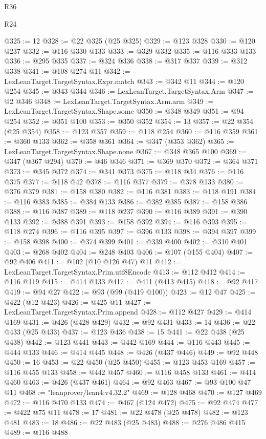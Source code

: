 \begin{lexlean}{R36}
\begin{lexlean}{R24}
\begin{coremodule}
{{{{{{{{{{{{{{{{{{{{{{{{{{{{{{{{{{{{{{{{{{{{{{{{{{{{{{{{{{{{{{{{{{{{{{{{{{{{{{{{{{{{{{{{{{{{{{{{{{{{{{{{{{{{{{{{{{{{{{{{{{{{{{{{{{{{{{{{{{{{{{{{{{{{{{{{{{{{{{{{{{{{{{{{{{{{{{{{{{{{{{{{{{{{{{{{{{{@325 := 12
@328 := @22 @325 (@25 @325)
@329 := @123 @328
@330 := @120 @237
@332 := @116 @330 @133
@333 := @329 @332
@335 := @116 @333 @133
@336 := @295 @335
@337 := @324 @336
@338 := @317 @337
@339 := @312 @338
@341 := @108 @274 @11
@342 := LexLeanTarget.TargetSyntax.Expr.match
@343 := @342 @11
@344 := @120 @254
@345 := @343 @344
@346 := LexLeanTarget.TargetSyntax.Arm
@347 := @2 @346
@348 := LexLeanTarget.TargetSyntax.Arm.arm
@349 := LexLeanTarget.TargetSyntax.Shape.some
@350 := @348 @349
@351 := @94 @254
@352 := @351 @100
@353 := @350 @352
@354 := 13
@357 := @22 @354 (@25 @354)
@358 := @123 @357
@359 := @118 @254
@360 := @116 @359
@361 := @360 @133
@362 := @358 @361
@364 := @347 (@353 @362)
@365 := LexLeanTarget.TargetSyntax.Shape.none
@367 := @348 @365 @100
@369 := @347 (@367 @294)
@370 := @46 @346
@371 := @369 @370
@372 := @364 @371
@373 := @345 @372
@374 := @341 @373
@375 := @118 @34
@376 := @116 @375
@377 := @118 @42
@378 := @116 @377
@379 := @378 @133
@380 := @376 @379
@381 := @158 @380
@382 := @116 @381
@383 := @118 @191
@384 := @116 @383
@385 := @384 @133
@386 := @382 @385
@387 := @158 @386
@388 := @116 @387
@389 := @118 @237
@390 := @116 @389
@391 := @390 @133
@392 := @388 @391
@393 := @158 @392
@394 := @116 @393
@395 := @118 @274
@396 := @116 @395
@397 := @396 @133
@398 := @394 @397
@399 := @158 @398
@400 := @374 @399
@401 := @339 @400
@402 := @310 @401
@403 := @268 @402
@404 := @248 @403
@406 := @107 (@155 @404)
@407 := @92 @406
@411 := @102 (@10 @126 @47) @11
@412 := LexLeanTarget.TargetSyntax.Prim.utf8Encode
@413 := @112 @412
@414 := @116 @119
@415 := @414 @133
@417 := @411 (@413 @415)
@418 := @92 @417
@419 := @94 @27
@422 := @93 (@99 (@419 @100))
@423 := @12 @47
@425 := @422 (@12 @423)
@426 := @425 @11
@427 := LexLeanTarget.TargetSyntax.Prim.append
@428 := @112 @427
@429 := @414 @169
@431 := @426 (@428 @429)
@432 := @92 @431
@433 := 14
@436 := @22 @433 (@25 @433)
@437 := @123 @436
@438 := 15
@441 := @22 @438 (@25 @438)
@442 := @123 @441
@443 := @442 @169
@444 := @116 @443
@445 := @444 @133
@446 := @414 @445
@448 := @426 (@437 @446)
@449 := @92 @448
@450 := 16
@453 := @22 @450 (@25 @450)
@455 := @123 @453 @169
@457 := @116 @455 @133
@458 := @442 @457
@460 := @116 @458 @133
@461 := @414 @460
@463 := @426 (@437 @461)
@464 := @92 @463
@467 := @93 @100 @47 @11
@468 := "leanprover/lean4:v4.32.2"
@469 := @128 @468
@470 := @127 @469
@472 := @116 @470 @133
@474 := @467 (@124 @472)
@475 := @92 @474
@477 := @422 @75 @11
@478 := 17
@481 := @22 @478 (@25 @478)
@482 := @123 @481
@483 := 18
@486 := @22 @483 (@25 @483)
@488 := @276 @486 @415
@489 := @116 @488
}}}}}}}}}}}}}}}}}}}}}}}}}}}}}}}}}}}}}}}}}}}}}}}}}}}}}}}}}}}}}}}}}}}}}}}}}}}}}}}}}}}}}}}}}}}}}}}}}}}}}}}}}}}}}}}}}}}}}}}}}}}}}}}}}}}}}}}}}}}}}}}}}}}}}}}}}}}}}}}}}}}}}}}}}}}}}}}}}}}}}}}}}}}}}}}}}}}
\end{coremodule}
\end{lexlean}
\end{lexlean}
